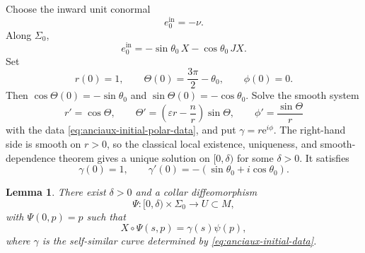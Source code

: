 \documentclass[11pt,a4paper]{article}
\numberwithin{equation}{section}
\newtheorem{lemma}[theorem]{Lemma}
\newcommand{\ee}{\mathrm e}
\begin{document}
Choose the inward unit conormal
$$
        e_0^{\mathrm{in}}=-\nu.
$$
Along $\Sigma_0$,
\begin{equation}\label{eq:initial-conormal}
        e_0^{\mathrm{in}}
        =-\sin\theta_0\,X-\cos\theta_0\,JX.
\end{equation}
Set
\begin{equation}\label{eq:anciaux-initial-polar-data}
        r(0)=1,
        \qquad
        \Theta(0)=\frac{3\pi}{2}-\theta_0,
        \qquad
        \phi(0)=0.
\end{equation}
Then
$\cos\Theta(0)=-\sin\theta_0$ and
$\sin\Theta(0)=-\cos\theta_0$.  Solve the smooth system
\begin{equation*}
        r'=\cos\Theta,
        \qquad
        \Theta'=\left(\varepsilon r-\frac nr\right)\sin\Theta,
        \qquad
        \phi'=\frac{\sin\Theta}{r}
\end{equation*}
with the data \eqref{eq:anciaux-initial-polar-data}, and put
$\gamma=r\ee^{i\phi}$.  The right-hand side is smooth on $r>0$, so the
classical local existence, uniqueness, and smooth-dependence theorem
\cite[Chapter~1]{CoddingtonLevinson1955} gives a unique solution on
$[0,\delta)$ for some $\delta>0$.  It satisfies
\begin{equation}\label{eq:anciaux-initial-data}
        \gamma(0)=1,
        \qquad
        \gamma'(0)=-(\sin\theta_0+i\cos\theta_0).
\end{equation}

\begin{lemma}\label{lem:anciaux-collar}
There exist $\delta>0$ and a collar diffeomorphism
$$
        \Psi:[0,\delta)\times\Sigma_0\longrightarrow U\subset M,
$$
with $\Psi(0,p)=p$ such that
\begin{equation}\label{eq:collar-product}
        X\circ\Psi(s,p)=\gamma(s)\psi(p),
\end{equation}
where $\gamma$ is the self-similar curve determined by \eqref{eq:anciaux-initial-data}.
\end{lemma}
\end{document}
